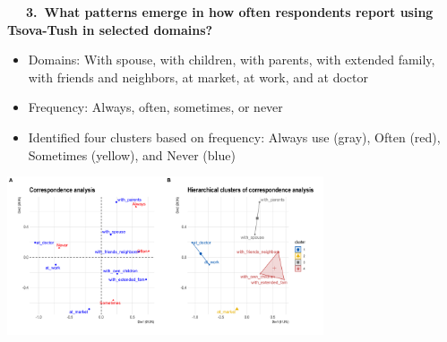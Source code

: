 \documentclass[portrait,fontscale=0.285,a0paper]{baposter2}
\newcommand{\compresslist}{ %
\setlength{\itemsep}{1pt}
\setlength{\parskip}{0pt}
\setlength{\parsep}{0pt}
}
\begin{document}
\begin{poster}
{{\vspace{-0.1in} \ \ \ \textbf{3.~What patterns emerge in how often respondents report using Tsova-Tush in selected domains?} 

\begin{itemize}[leftmargin=*]\compresslist
\item Domains: With spouse, with  children, with  parents, with extended family, with friends and neighbors, at market, at work, and at doctor
\item Frequency: Always, often, sometimes, or never
\item Identified four clusters based on frequency: Always use (gray), Often (red), Sometimes (yellow), and Never (blue)
\end{itemize}
}

\begin{center}

   \includegraphics[width=0.7\textwidth]{ca-clusters-full.png} \vspace{-0.3in}
\end{center}



}
















\end{poster}
\end{document}
